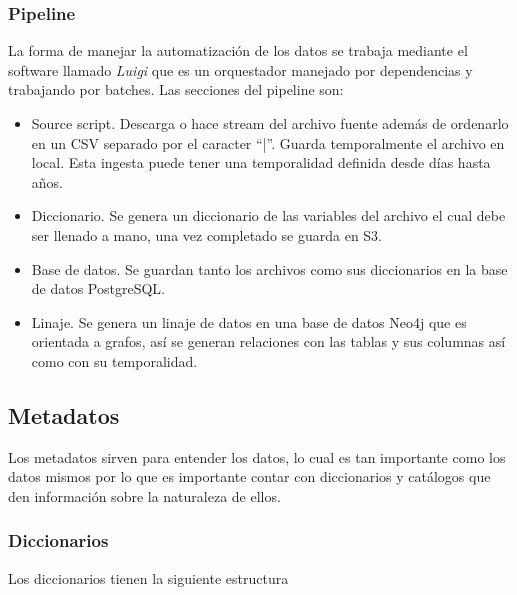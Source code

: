 \subsubsection{Pipeline}
La forma de manejar la automatización de los datos se trabaja mediante el software llamado \textit{Luigi} que es un orquestador manejado por dependencias y trabajando por batches. Las secciones del pipeline son:
\begin{itemize}
    \item Source script. Descarga o hace stream del archivo fuente además de ordenarlo en un CSV separado por el caracter ``|''. Guarda temporalmente el archivo en local. Esta ingesta puede tener una temporalidad definida desde días hasta años.
    \item Diccionario. Se genera un diccionario de las variables del archivo el cual debe ser llenado a mano, una vez completado se guarda en S3.
    \item Base de datos. Se guardan tanto los archivos como sus diccionarios en la base de datos PostgreSQL.
    \item Linaje. Se genera un linaje de datos en una base de datos Neo4j que es orientada a grafos, así se generan relaciones con las tablas y sus columnas así como con su temporalidad.
\end{itemize}
\subsection{Metadatos}
Los metadatos sirven para entender los datos, lo cual es tan importante como los datos mismos por lo que es importante contar con diccionarios y catálogos que den información sobre la naturaleza de ellos.
\subsubsection{Diccionarios}
Los diccionarios tienen la siguiente estructura

